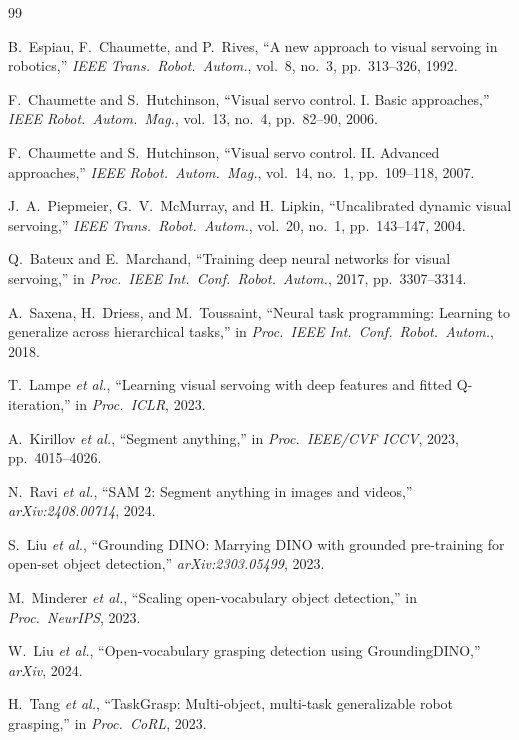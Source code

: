 \documentclass[lettersize,journal]{IEEEtran}
\begin{document}
\begin{thebibliography}{99}

B.~Espiau, F.~Chaumette, and P.~Rives,
``A new approach to visual servoing in robotics,''
\emph{IEEE Trans.\ Robot.\ Autom.}, vol.~8, no.~3, pp.~313--326, 1992.

F.~Chaumette and S.~Hutchinson,
``Visual servo control. I. Basic approaches,''
\emph{IEEE Robot.\ Autom.\ Mag.}, vol.~13, no.~4, pp.~82--90, 2006.

F.~Chaumette and S.~Hutchinson,
``Visual servo control. II. Advanced approaches,''
\emph{IEEE Robot.\ Autom.\ Mag.}, vol.~14, no.~1, pp.~109--118, 2007.

J.~A.~Piepmeier, G.~V.~McMurray, and H.~Lipkin,
``Uncalibrated dynamic visual servoing,''
\emph{IEEE Trans.\ Robot.\ Autom.}, vol.~20, no.~1, pp.~143--147, 2004.

Q.~Bateux and E.~Marchand,
``Training deep neural networks for visual servoing,''
in \emph{Proc.\ IEEE Int.\ Conf.\ Robot.\ Autom.}, 2017, pp.~3307--3314.

A.~Saxena, H.~Driess, and M.~Toussaint,
``Neural task programming: Learning to generalize across hierarchical tasks,''
in \emph{Proc.\ IEEE Int.\ Conf.\ Robot.\ Autom.}, 2018.

T.~Lampe \emph{et al.},
``Learning visual servoing with deep features and fitted Q-iteration,''
in \emph{Proc.\ ICLR}, 2023.

A.~Kirillov \emph{et al.},
``Segment anything,''
in \emph{Proc.\ IEEE/CVF ICCV}, 2023, pp.~4015--4026.

N.~Ravi \emph{et al.},
``SAM 2: Segment anything in images and videos,''
\emph{arXiv:2408.00714}, 2024.

S.~Liu \emph{et al.},
``Grounding DINO: Marrying DINO with grounded pre-training for open-set
object detection,''
\emph{arXiv:2303.05499}, 2023.

M.~Minderer \emph{et al.},
``Scaling open-vocabulary object detection,''
in \emph{Proc.\ NeurIPS}, 2023.

W.~Liu \emph{et al.},
``Open-vocabulary grasping detection using GroundingDINO,''
\emph{arXiv}, 2024.

H.~Tang \emph{et al.},
``TaskGrasp: Multi-object, multi-task generalizable robot grasping,''
in \emph{Proc.\ CoRL}, 2023.


\end{thebibliography}
\end{document}

